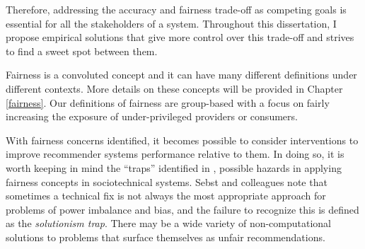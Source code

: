 \begin{comment}
Although increasing accuracy for better personalization can be a double edged sword. 
On the one hand, accuracy is known to be strongly tied with user satisfaction and is financially conducive for the system. On the other hand, increase in accuracy might contribute to

The end goal for the system is to serve users and benefits them. While in many cases, due to biases in the data (such as popularity bias) or the bias propagation over time, etc. more than a certain level of accuracy will become harmful to users from other aspects. Some of these other aspects are measures by beyond-accuracy measures such as diversity, fairness, serendipity.
The previous research in the literature shows that increasing diversity in the recommendations increases user satisfaction, while we know diversity has a trade-off with accuracy.

These issue complicate the research problems more since, we need to understand these aspects of the problem in order to meticulously identify the context of the problem, the type of unfairness we can address, and the the family of solutions that we want to adopt in order to operationalize fairness in recommender systems.
\end{comment}





Therefore, addressing the accuracy and fairness trade-off as competing goals is essential for all the stakeholders of a system. Throughout this dissertation, I propose empirical solutions that give more control over this trade-off and strives to find a sweet spot between them. 

Fairness is a convoluted concept and it can have many different definitions under different contexts. More details on these concepts will be provided in Chapter \ref{fairness}. Our definitions of fairness are group-based with a focus on fairly increasing the exposure of under-privileged providers or consumers. 

With fairness concerns identified, it becomes possible to consider interventions to improve recommender systems performance relative to them. 
In doing so, it is worth keeping in mind the ``traps'' identified in \cite{selbst2019fairness}, possible hazards in applying fairness concepts in sociotechnical systems. Sebst and colleagues note that sometimes a technical fix is not always the most appropriate approach for problems of power imbalance and bias, and the failure to recognize this is defined as the \textit{solutionism trap}. There may be a wide variety of non-computational solutions to problems that surface themselves as unfair recommendations. 


